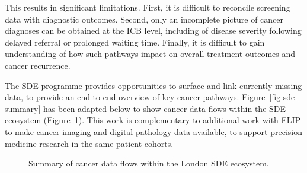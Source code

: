 \documentclass[
  letterpaper,
  DIV=11,
  numbers=noendperiod]{scrartcl}
\begin{document}
This results in significant limitations. First, it is difficult to
reconcile screening data with diagnostic outcomes. Second, only an
incomplete picture of cancer diagnoses can be obtained at the ICB level,
including of disease severity following delayed referral or prolonged
waiting time. Finally, it is difficult to gain understanding of how such
pathways impact on overall treatment outcomes and cancer recurrence.

The SDE programme provides opportunities to surface and link currently
missing data, to provide an end-to-end overview of key cancer pathways.
Figure~\ref{fig-sde-summary} has been adapted below to show cancer data
flows within the SDE ecosystem (Figure~\ref{fig-cancer-data}). This work
is complementary to additional work with FLIP to make cancer imaging and
digital pathology data available, to support precision medicine research
in the same patient cohorts.

\begin{figure}


\caption{\label{fig-cancer-data}Summary of cancer data flows within the
London SDE ecosystem.}

\end{figure}%
\end{document}
